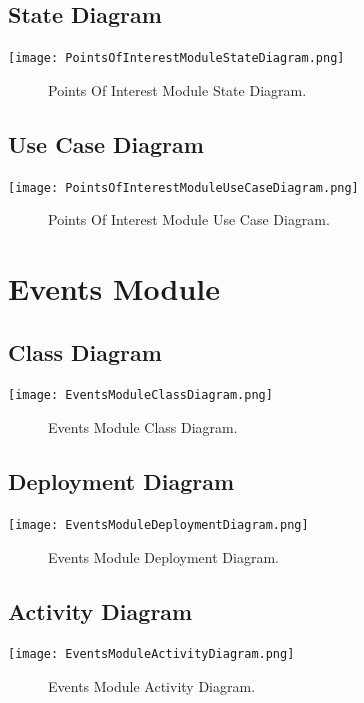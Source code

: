 \documentclass[12pt]{article}
\begin{document}
	
	\subsection{State Diagram}
       \texttt{[image: PointsOfInterestModuleStateDiagram.png]}
        \begin{figure}[h]
        	\caption{Points Of Interest Module State Diagram.}
        \end{figure}
	
	\subsection{Use Case Diagram}
        	\texttt{[image: PointsOfInterestModuleUseCaseDiagram.png]}
        	\begin{figure}[h]
        		\caption{Points Of Interest Module Use Case Diagram.}
        	\end{figure}
        	
   
   \section{Events Module}
	
	\subsection{Class Diagram}
        \texttt{[image: EventsModuleClassDiagram.png]}
        \begin{figure}[h]
            \caption{Events Module Class Diagram.}
        \end{figure}
    
    \subsection{Deployment Diagram}
        \texttt{[image: EventsModuleDeploymentDiagram.png]}
        \begin{figure}[h]
            \caption{Events Module Deployment Diagram.}
        \end{figure}
        
    \subsection{Activity Diagram}
        \texttt{[image: EventsModuleActivityDiagram.png]}
        \begin{figure}
            \caption{Events Module Activity Diagram.}
        \end{figure}
\end{document}
